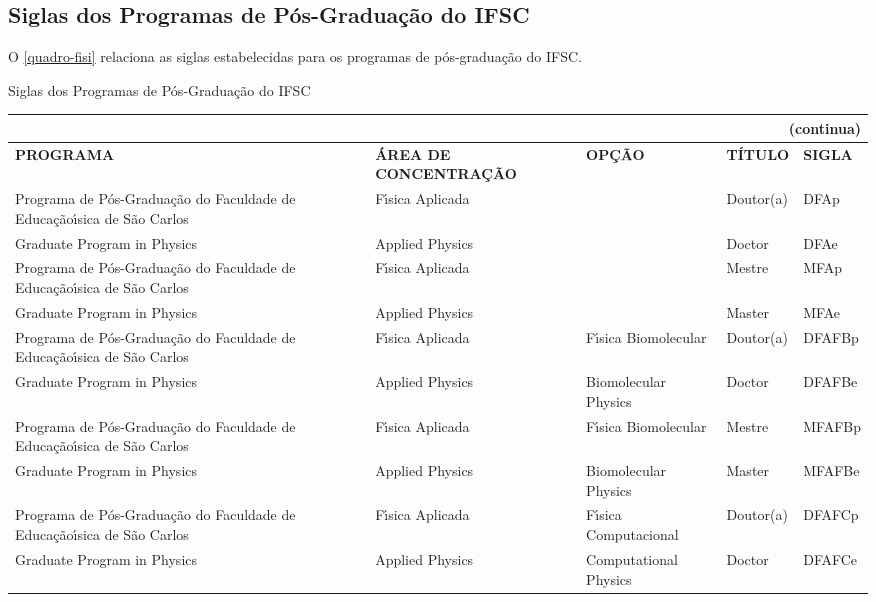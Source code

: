 \begin{apendicesenv}
\chapter{Siglas dos Programas de P\'os-Gradua\c{c}\~ao do IFSC}
O \autoref{quadro-fisi} relaciona as siglas estabelecidas para os programas de p\'os-gradua\c{c}\~ao do IFSC.
\begin{quadro}[Htb] 
	\ABNTEXfontereduzida
	\caption[Siglas dos Programas de P\'os-Gradua\c{c}\~ao do IFSC]{Siglas dos Programas de P\'os-Gradua\c{c}\~ao do IFSC}
	\label{quadro-fisi}
	\begin{tabular}{|p{3.5cm}|p{3.5cm}|p{3.5cm}|p{1.5cm}|p{2.25cm}|}
	\multicolumn{5}{r}{{(continua)}} \\ 
    \hline
		\textbf{PROGRAMA} & \textbf{\'AREA DE CONCENTRA\c{C}\~AO} & \textbf{OP\c{C}\~AO} & \textbf{T\'ITULO} & \textbf{SIGLA}  \\
		\hline
		Programa de P\'os-Gradua\c{c}\~ao do Faculdade de Educa\c{c}\~ao\'{\i}sica de S\~ao Carlos & F\'{\i}sica Aplicada &  & Doutor(a) & DFAp\\
		Graduate Program in Physics & Applied Physics &  & Doctor & DFAe\\
		Programa de P\'os-Gradua\c{c}\~ao do Faculdade de Educa\c{c}\~ao\'{\i}sica de S\~ao Carlos & F\'{\i}sica Aplicada &  & Mestre & MFAp\\
		Graduate Program in Physics & Applied Physics &  & Master & MFAe\\
		Programa de P\'os-Gradua\c{c}\~ao do Faculdade de Educa\c{c}\~ao\'{\i}sica de S\~ao Carlos & F\'{\i}sica Aplicada & F\'{\i}sica Biomolecular & Doutor(a) & DFAFBp\\
		Graduate Program in Physics & Applied Physics & Biomolecular Physics & Doctor & DFAFBe\\
		Programa de P\'os-Gradua\c{c}\~ao do Faculdade de Educa\c{c}\~ao\'{\i}sica de S\~ao Carlos & F\'{\i}sica Aplicada & F\'{\i}sica Biomolecular & Mestre & MFAFBp\\
		Graduate Program in Physics & Applied Physics & Biomolecular Physics & Master & MFAFBe\\
		Programa de P\'os-Gradua\c{c}\~ao do Faculdade de Educa\c{c}\~ao\'{\i}sica de S\~ao Carlos & F\'{\i}sica Aplicada & F\'{\i}sica Computacional & Doutor(a) & DFAFCp\\
		Graduate Program in Physics & Applied Physics & Computational Physics & Doctor & DFAFCe\\		

	\end{tabular}
\end{quadro}


\end{apendicesenv}
